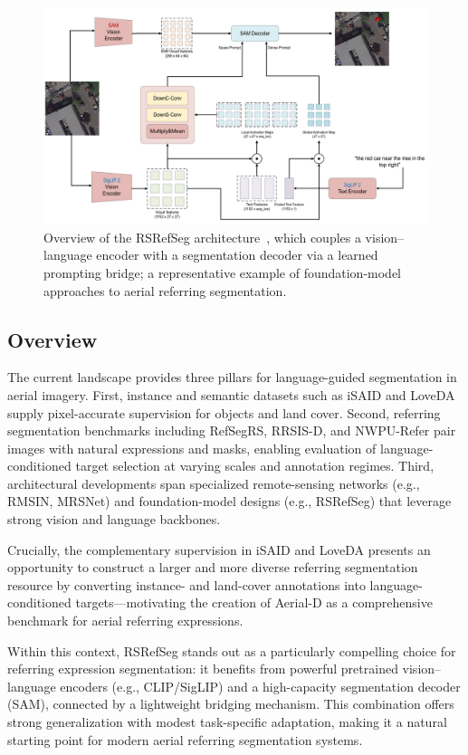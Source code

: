 \begin{figure}[t]
\centering
\includegraphics[width=\textwidth]{./images/rsrefseg.png}
\caption{Overview of the RSRefSeg architecture~\cite{chen2025rsrefseg}, which couples a vision–language encoder with a segmentation decoder via a learned prompting bridge; a representative example of foundation-model approaches to aerial referring segmentation.}
\label{fig:rsrefseg_arch}
\end{figure}

\subsection{Overview}

The current landscape provides three pillars for language-guided segmentation in aerial imagery. First, instance and semantic datasets such as iSAID and LoveDA supply pixel-accurate supervision for objects and land cover. Second, referring segmentation benchmarks including RefSegRS, RRSIS-D, and NWPU-Refer pair images with natural expressions and masks, enabling evaluation of language-conditioned target selection at varying scales and annotation regimes. Third, architectural developments span specialized remote-sensing networks (e.g., RMSIN, MRSNet) and foundation-model designs (e.g., RSRefSeg) that leverage strong vision and language backbones.

Crucially, the complementary supervision in iSAID and LoveDA presents an opportunity to construct a larger and more diverse referring segmentation resource by converting instance- and land-cover annotations into language-conditioned targets—motivating the creation of Aerial-D as a comprehensive benchmark for aerial referring expressions.

Within this context, RSRefSeg stands out as a particularly compelling choice for referring expression segmentation: it benefits from powerful pretrained vision–language encoders (e.g., CLIP/SigLIP) and a high-capacity segmentation decoder (SAM), connected by a lightweight bridging mechanism. This combination offers strong generalization with modest task-specific adaptation, making it a natural starting point for modern aerial referring segmentation systems.
